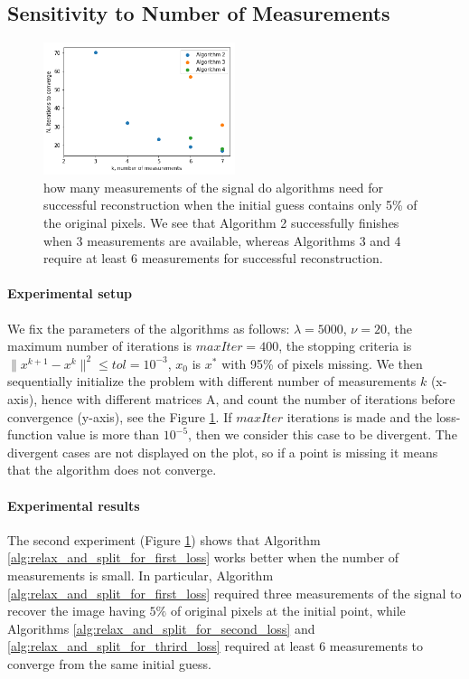 \documentclass[11pt,letterpaper]{article}
\numberwithin{equation}{section} %
\numberwithin{figure}{section} %
\numberwithin{table}{section} %
\begin{document}
\subsection{Sensitivity to Number of Measurements}
\begin{figure}[h!]
    \centering
    \includegraphics[width=0.5\textwidth]{images/result_number_of_measurements}
    \caption{\label{fig:resits_number_of_measurements} how many measurements of the signal do algorithms need for successful reconstruction when the initial guess contains only 5\% of the original pixels. We see that Algorithm 2 successfully finishes when 3 measurements are available, whereas Algorithms 3 and 4 require at least 6 measurements for successful reconstruction.}
\end{figure}
\paragraph{Experimental setup} We fix the parameters of the algorithms as follows: $\lambda = 5000$, $\nu = 20$, the maximum number of iterations is $maxIter = 400$, the stopping criteria is $\|x^{k+1} - x^{k}\|^2 \leq tol = 10^{-3}$, $x_0$ is $x^*$ with 95\% of pixels missing. We then sequentially initialize the problem with different number of measurements $k$ (x-axis), hence with different matrices A, and count the number of iterations before convergence (y-axis), see the Figure \ref{fig:resits_number_of_measurements}. If $maxIter$ iterations is made and the loss-function value is more than $10^{-5}$, then we consider this case to be divergent. The divergent cases are not displayed on the plot, so if a point is missing it means that the algorithm does not converge.
\paragraph{Experimental results}
 The second experiment (Figure \ref{fig:resits_number_of_measurements}) shows that Algorithm \ref{alg:relax_and_split_for_first_loss} works better when the number of measurements is small. In particular, Algorithm \ref{alg:relax_and_split_for_first_loss} required three measurements of the signal to recover the image having $5\%$ of original pixels at the initial point, while Algorithms \ref{alg:relax_and_split_for_second_loss} and \ref{alg:relax_and_split_for_thrird_loss} required at least 6 measurements to converge from the same initial guess. 
\end{document}
